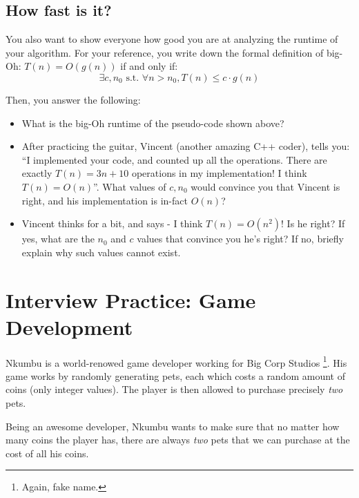 \documentclass [12pt]{article}
\begin{document}
\subsection{How fast is it?}
 You also want to show everyone how good you are at analyzing the runtime of your algorithm. For your reference, you write down the formal definition of big-Oh: $T(n)= O(g(n))$ if and only if:
$$
\exists c, n_0 \text{ s.t. } \forall n > n_0, T(n) \leq c \cdot g(n)
$$

Then, you answer the following:
\begin{itemize}
    \item {} What is the big-Oh runtime of the pseudo-code shown above?
    \item {} After practicing the guitar, Vincent (another amazing C++ coder),  tells you: ``I implemented your code, and counted up all the operations. There are exactly $T(n) = 3n + 10$ operations in my implementation! I think $T(n) = O(n)$''. What values of $c, n_0$ would convince you that Vincent is right, and his implementation is in-fact $O(n)$?
    \item {} Vincent thinks for a bit, and says - I think $T(n) = O(n^2)$! Is he right? If yes, what are the $n_0$ and $c$ values that convince you he's right? If no, briefly explain why such values cannot exist.
\end{itemize}




\pagebreak
\section{Interview Practice: Game Development}
 Nkumbu is a world-renowed game developer working for Big Corp Studios \footnote{Again, fake name.}. His game works by randomly generating pets, each which costs a random amount of coins (only integer values). The player is then allowed to purchase precisely \textit{two} pets. 

Being an awesome developer, Nkumbu wants to make sure that no matter how many coins the player has, there are always \textit{two} pets that we can purchase at the cost of all his coins.
\end{document}
